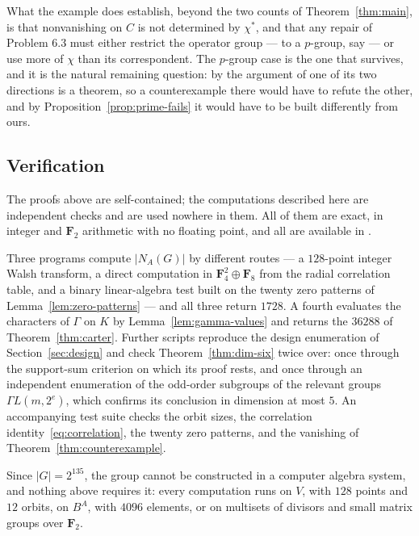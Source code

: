 \documentclass[11pt,a4paper,reqno]{amsart}
\theoremstyle{definition}
\theoremstyle{remark}
\newcommand{\F}{\mathbf F}
\begin{document}
What the example does establish, beyond the two counts of
Theorem~\ref{thm:main}, is that nonvanishing on $C$ is not determined by
$\chi^*$, and that any repair of Problem 6.3 must either restrict the
operator group --- to a $p$-group, say --- or use more of $\chi$ than
its correspondent.  The $p$-group case is the one that survives, and it
is the natural remaining question: by the argument of
\cite[\S7]{isaacs-carter} one of its two directions is a theorem, so a
counterexample there would have to refute the other, and by
Proposition~\ref{prop:prime-fails} it would have to be built
differently from ours.

\subsection*{Verification}\label{sec:verification}

The proofs above are self-contained; the computations described here are
independent checks and are used nowhere in them.  All of them are exact,
in integer and $\F_2$ arithmetic with no floating point, and all are
available in \cite{code}.

Three programs compute $|N_A(G)|$ by different routes --- a $128$-point
integer Walsh transform, a direct computation in $\F_4^2\oplus\F_8$ from
the radial correlation table, and a binary linear-algebra test built on
the twenty zero patterns of Lemma~\ref{lem:zero-patterns} --- and all
three return $1728$.  A fourth evaluates the characters of $\Gamma$ on
$K$ by Lemma~\ref{lem:gamma-values} and returns the $36288$ of
Theorem~\ref{thm:carter}.  Further scripts reproduce the design
enumeration of Section~\ref{sec:design} and check
Theorem~\ref{thm:dim-six} twice over: once through the support-sum
criterion on which its proof rests, and once through an independent
enumeration of the odd-order subgroups of the relevant groups
$\Gamma L(m,2^e)$, which confirms its conclusion in dimension at most
$5$.  An accompanying test suite checks the orbit sizes, the correlation
identity~\eqref{eq:correlation}, the twenty zero patterns, and the
vanishing of Theorem~\ref{thm:counterexample}.

Since $|G|=2^{135}$, the group cannot be constructed in a computer
algebra system, and nothing above requires it: every computation runs on
$V$, with $128$ points and $12$ orbits, on $B^A$, with $4096$ elements,
or on multisets of divisors and small matrix groups over $\F_2$.
\end{document}
